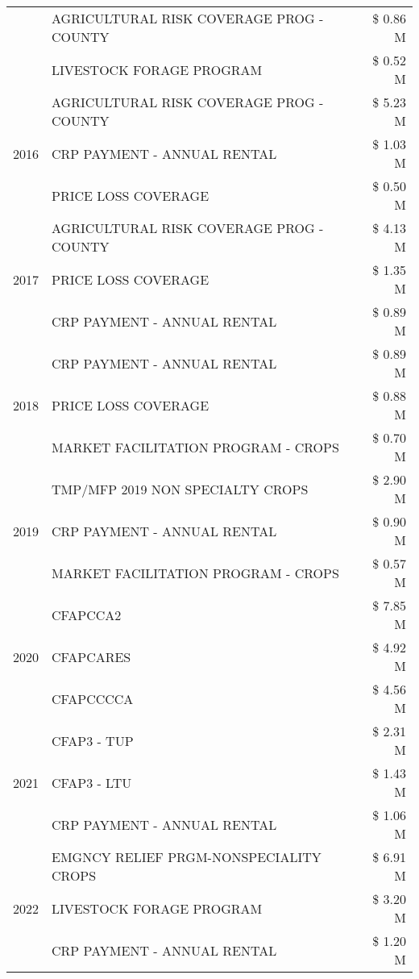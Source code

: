 \begin{tabular}{llr}
 & AGRICULTURAL RISK COVERAGE PROG - COUNTY & \$ 0.86 M \\
 & LIVESTOCK FORAGE PROGRAM & \$ 0.52 M \\
\cline{1-3}
\multirow[t]{3}{*}{2016} & AGRICULTURAL RISK COVERAGE PROG - COUNTY & \$ 5.23 M \\
 & CRP PAYMENT - ANNUAL RENTAL & \$ 1.03 M \\
 & PRICE LOSS COVERAGE & \$ 0.50 M \\
\cline{1-3}
\multirow[t]{3}{*}{2017} & AGRICULTURAL RISK COVERAGE PROG - COUNTY & \$ 4.13 M \\
 & PRICE LOSS COVERAGE & \$ 1.35 M \\
 & CRP PAYMENT - ANNUAL RENTAL & \$ 0.89 M \\
\cline{1-3}
\multirow[t]{3}{*}{2018} & CRP PAYMENT - ANNUAL RENTAL & \$ 0.89 M \\
 & PRICE LOSS COVERAGE & \$ 0.88 M \\
 & MARKET FACILITATION PROGRAM - CROPS & \$ 0.70 M \\
\cline{1-3}
\multirow[t]{3}{*}{2019} & TMP/MFP 2019 NON SPECIALTY CROPS & \$ 2.90 M \\
 & CRP PAYMENT - ANNUAL RENTAL & \$ 0.90 M \\
 & MARKET FACILITATION PROGRAM - CROPS & \$ 0.57 M \\
\cline{1-3}
\multirow[t]{3}{*}{2020} & CFAPCCA2 & \$ 7.85 M \\
 & CFAPCARES & \$ 4.92 M \\
 & CFAPCCCCA & \$ 4.56 M \\
\cline{1-3}
\multirow[t]{3}{*}{2021} & CFAP3 - TUP & \$ 2.31 M \\
 & CFAP3 - LTU & \$ 1.43 M \\
 & CRP PAYMENT - ANNUAL RENTAL & \$ 1.06 M \\
\cline{1-3}
\multirow[t]{3}{*}{2022} & EMGNCY RELIEF PRGM-NONSPECIALITY CROPS & \$ 6.91 M \\
 & LIVESTOCK FORAGE PROGRAM & \$ 3.20 M \\
 & CRP PAYMENT - ANNUAL RENTAL & \$ 1.20 M \\
\cline{1-3}
\bottomrule
\end{tabular}
